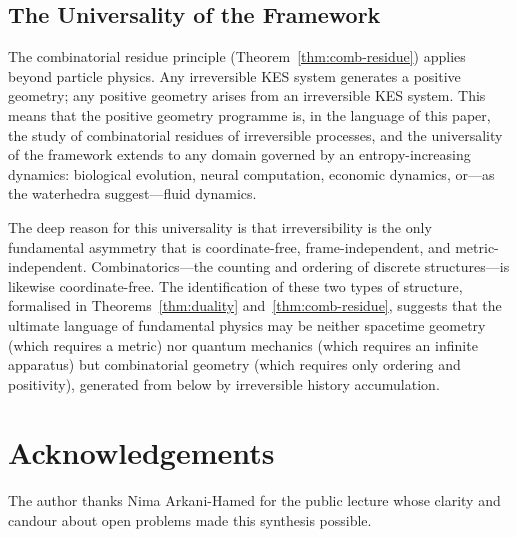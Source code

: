 \documentclass[12pt, oneside]{amsart}
\theoremstyle{plain}
\theoremstyle{definition}
\theoremstyle{remark}
\begin{document}
\subsection{The Universality of the Framework}

The combinatorial residue principle (Theorem~\ref{thm:comb-residue}) applies beyond particle physics. Any irreversible KES system generates a positive geometry; any positive geometry arises from an irreversible KES system. This means that the positive geometry programme is, in the language of this paper, the study of combinatorial residues of irreversible processes, and the universality of the framework extends to any domain governed by an entropy-increasing dynamics: biological evolution, neural computation, economic dynamics, or---as the waterhedra suggest---fluid dynamics.

The deep reason for this universality is that irreversibility is the only fundamental asymmetry that is coordinate-free, frame-independent, and metric-independent. Combinatorics---the counting and ordering of discrete structures---is likewise coordinate-free. The identification of these two types of structure, formalised in Theorems~\ref{thm:duality} and~\ref{thm:comb-residue}, suggests that the ultimate language of fundamental physics may be neither spacetime geometry (which requires a metric) nor quantum mechanics (which requires an infinite apparatus) but combinatorial geometry (which requires only ordering and positivity), generated from below by irreversible history accumulation.

\section*{Acknowledgements}

The author thanks Nima Arkani-Hamed for the public lecture whose clarity and candour about open problems made this synthesis possible.

\end{document}
